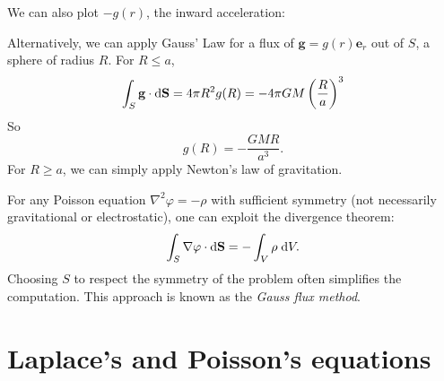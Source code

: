 \documentclass[a4paper]{article}
\begin{document}
\begin{eg}
\begin{center}
  \end{center}
  We can also plot $-g(r)$, the inward acceleration:
  \begin{center}
  \end{center}
  Alternatively, we can apply Gauss' Law for a flux of $\mathbf{g} = g(r) \mathbf{e}_r$ out of $S$, a sphere of radius $R$. For $R \leq a$,
  \[
    \int_S \mathbf{g}\cdot \mathrm{d} \mathbf{S} = 4\pi R^2 g(R) = -4\pi GM\left(\frac{R}{a}\right)^3
  \]
  So
  \[
    g(R) = -\frac{GMR}{a^3}.
  \]
  For $R \geq a$, we can simply apply Newton's law of gravitation.

  \end{eg}

\begin{rmk}
  For any Poisson equation $\nabla^2 \varphi = -\rho$ with sufficient symmetry (not necessarily gravitational or electrostatic), one can exploit the divergence theorem:
  \[
    \int_S \nabla \varphi \cdot \mathrm{d} \mathbf{S} = -\int_V \rho \;\mathrm{d} V.
  \]
  Choosing $S$ to respect the symmetry of the problem often simplifies the computation. This approach is known as the \emph{Gauss flux method}.
\end{rmk}

\section{Laplace's and Poisson's equations}
\end{document}
